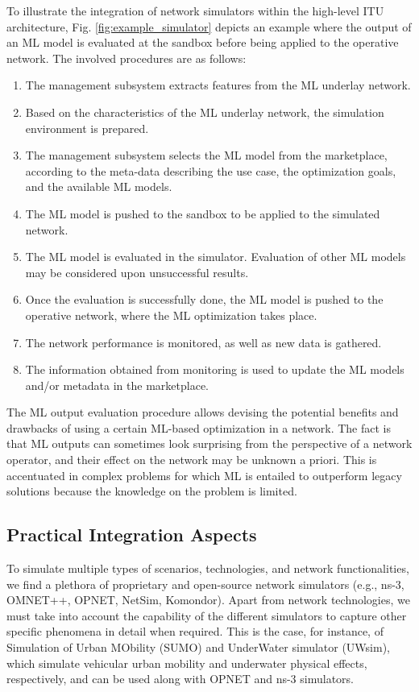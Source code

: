 \documentclass{article}
\begin{document}
	To illustrate the integration of network simulators within the high-level ITU architecture, Fig. \ref{fig:example_simulator} depicts an example where the output of an ML model is evaluated at the sandbox before being applied to the operative network. The involved procedures are as follows:
	\begin{enumerate}
		\item The management subsystem extracts features from the ML underlay network.
		\item Based on the characteristics of the ML underlay network, the simulation environment is prepared.
		\item The management subsystem selects the ML model from the marketplace, according to the meta-data describing the use case, the optimization goals, and the available ML models.
		\item The ML model is pushed to the sandbox to be applied to the simulated network.
		\item The ML model is evaluated in the simulator. Evaluation of other ML models may be considered upon unsuccessful results.
		\item Once the evaluation is successfully done, the ML model is pushed to the operative network, where the ML optimization takes place. 
		\item The network performance is monitored, as well as new data is gathered.
		\item The information obtained from monitoring is used to update the ML models and/or metadata in the marketplace.  
	\end{enumerate}

    The ML output evaluation procedure allows devising the potential benefits and drawbacks of using a certain ML-based optimization in a network. The fact is that ML outputs can sometimes look surprising from the perspective of a network operator, and their effect on the network may be unknown a priori. This is accentuated in complex problems for which ML is entailed to outperform legacy solutions because the knowledge on the problem is limited.

	\subsection{Practical Integration Aspects}
	
	To simulate multiple types of scenarios, technologies, and network functionalities, we find a plethora of proprietary and open-source network simulators (e.g., ns-3, OMNET++, OPNET, NetSim, Komondor). Apart from network technologies, we must take into account the capability of the different simulators to capture other specific phenomena in detail when required. This is the case, for instance, of Simulation of Urban MObility (SUMO) and UnderWater simulator (UWsim), which simulate vehicular urban mobility and underwater physical effects, respectively, and can be used along with OPNET and ns-3 simulators.
	     
\end{document}
